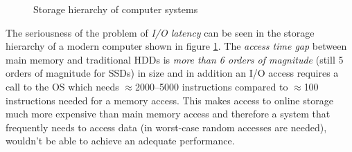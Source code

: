 \begin{@empty}
\begin{figure}
\begin{minipage}{\linewidth}
{
        }
        \end{minipage}
    \vspace{.5em}
    \caption[Storage hierarchy of computer systems]{Storage hierarchy of computer systems}
    \label{fig:storagehierarchy}
    \protect
    \end{figure}
\end{@empty}

    The seriousness of the problem of \emph{I/O latency} can be seen in the storage hierarchy of a modern computer shown in figure \ref{fig:storagehierarchy}. The \emph{access time gap} between main memory and traditional HDDs is \emph{more than 6 orders of magnitude} (still 5 orders of magnitude for SSDs) in size and in addition an I/O access requires a call to the OS which needs $\approx$\numrange{2000}{5000} instructions compared to $\approx$\num{100} instructions needed for a memory access. This makes access to online storage much more expensive than main memory access and therefore a system that frequently needs to access data (in worst-case random accesses are needed), wouldn't be able to achieve an adequate performance.

